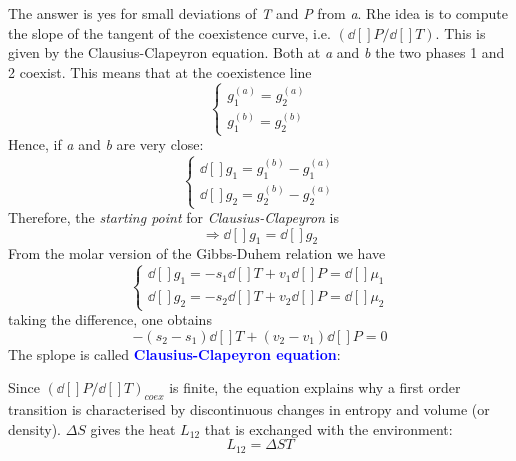 \documentclass[../main/main.tex]{subfiles}
\begin{document}
The answer is yes for small deviations of \emph{T} and \emph{P} from \emph{a}. Rhe idea is to compute the slope of the tangent of the coexistence curve, i.e. \( (\dd[]{P}/\dd[]{T}  )  \). This is given by the Clausius-Clapeyron equation.
Both at \emph{a} and \emph{b} the two phases 1 and 2 coexist. This means  that at the coexistence line
\begin{equation}
  \begin{cases}
   g_1^{(a)} = g_2^{(a)}\\
   g_1^{(b)} = g_2^{(b)}
  \end{cases}
\label{eq:}
\end{equation}
Hence, if \emph{a} and \emph{b} are very close:
\begin{equation}
  \begin{cases}
  \dd[]{g_1} = g_1^{(b)} - g_1^{(a)} \\
  \dd[]{g_2} = g_2^{(b)} - g_2^{(a)}
  \end{cases}
\label{eq:}
\end{equation}
Therefore, the \emph{starting point} for \emph{Clausius-Clapeyron} is
\begin{equation}
  \Rightarrow \dd[]{g_1} =\dd[]{g_2}
  \label{eq:}
\end{equation}
From the molar version of the Gibbs-Duhem relation we have
\begin{equation}
  \begin{cases}
   \dd[]{g_1} = -s_1 \dd[]{T} + v_1 \dd[]{P} = \dd[]{\mu _1}    \\
   \dd[]{g_2} = -s_2 \dd[]{T} + v_2 \dd[]{P} = \dd[]{\mu _2}
  \end{cases}
\label{eq:}
\end{equation}
taking the difference, one obtains
\begin{equation}
  -(s_2 - s_1) \dd[]{T} + (v_2 - v_1) \dd[]{P} = 0
  \label{eq:}
\end{equation}
The splope is called \textcolor{blue}{\textbf{Clausius-Clapeyron equation}}:
\begin{remark}
Since \( (\dd[]{P}/\dd[]{T})_{coex}   \) is finite, the equation explains why a first order transition is characterised by discontinuous changes in entropy and volume (or density). \( \Delta S \)  gives the heat \( L_{12} \) that is exchanged with the environment:
\begin{equation}
  L_{12} = \Delta S T
  \label{eq:}
\end{equation}
\end{remark}
\end{document}
